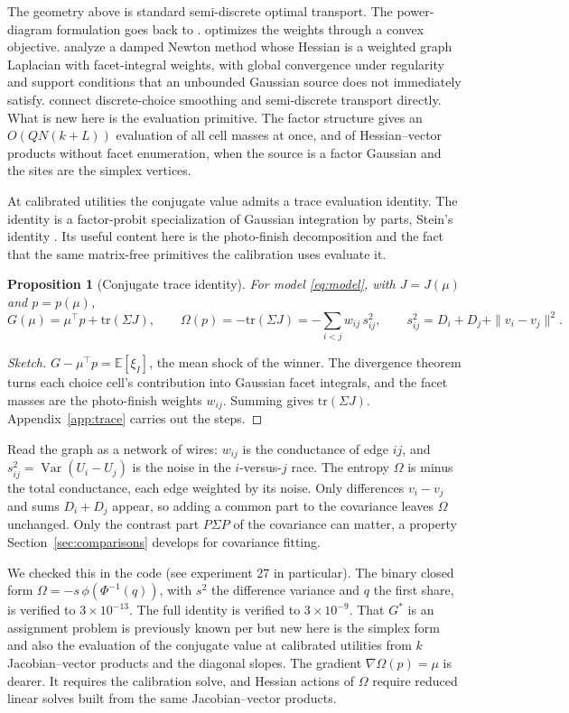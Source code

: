 \documentclass[12pt]{article}
\newtheorem{proposition}{Proposition}
\theoremstyle{remark}
\newcommand{\E}{\mathbb{E}}
\begin{document}
The geometry above is standard semi-discrete optimal transport. The
power-diagram formulation goes back to \citet{aurenhammer1998}.
\citet{levy2015} optimizes the weights through a convex objective.
\citet{kmt2019} analyze a damped Newton method whose Hessian is a
weighted graph Laplacian with facet-integral weights, with global
convergence under regularity and support conditions that an unbounded
Gaussian source does not immediately satisfy. \citet{taskesen2023}
connect discrete-choice smoothing and semi-discrete transport directly.
What is new here is the evaluation primitive. The factor structure gives an
$O(QN(k+L))$ evaluation of all cell masses at once, and of
Hessian--vector products without facet enumeration, when the source is
a factor Gaussian and the sites are the simplex vertices.

At calibrated utilities the conjugate value admits a trace evaluation
identity. The identity is a factor-probit specialization of Gaussian
integration by parts, Stein's identity \citep{stein1981}. Its useful
content here is the photo-finish decomposition and the fact that the
same matrix-free primitives the calibration uses evaluate it.

\begin{proposition}[Conjugate trace identity]\label{prop:trace}
For model \eqref{eq:model}, with $J = J(\mu)$ and $p = p(\mu)$,
\[
G(\mu) = \mu^\top p + \mathrm{tr}(\Sigma J),
\qquad
\Omega(p) = -\mathrm{tr}(\Sigma J)
= -\sum_{i<j} w_{ij}\, s_{ij}^2, \qquad
s_{ij}^2 = D_i + D_j + \|v_i - v_j\|^2 .
\]
\end{proposition}
\begin{proof}[Sketch]
$G - \mu^\top p = \E[\xi_I]$, the mean shock of the winner. The
divergence theorem turns each choice cell's contribution into Gaussian
facet integrals, and the facet masses are the photo-finish weights
$w_{ij}$. Summing gives $\mathrm{tr}(\Sigma J)$.
Appendix~\ref{app:trace} carries out the steps.
\end{proof}
Read the graph
as a network of wires: $w_{ij}$ is the conductance of
edge $ij$, and $s_{ij}^2 = \operatorname{Var}(U_i - U_j)$ is the noise in the
$i$-versus-$j$ race. The entropy $\Omega$ is minus the total
conductance, each edge weighted by its noise. Only differences $v_i -
v_j$ and sums $D_i + D_j$ appear, so adding a common part to the
covariance leaves $\Omega$ unchanged. Only the contrast part
$P\Sigma P$ of the covariance can matter, a property
Section~\ref{sec:comparisons} develops for covariance fitting.

We checked this in the code (see experiment 27 in particular). The
binary closed form $\Omega = -s\,\phi(\Phi^{-1}(q))$, with $s^2$ the
difference variance and $q$ the first share, is verified to
$3\times10^{-13}$. The full identity is verified to $3\times10^{-9}$. That $G^*$ is an assignment problem is previously known per
\citet{chiong2016} but new here is the simplex form and also the
evaluation of the conjugate value
at calibrated utilities from $k$ Jacobian--vector products and the
diagonal slopes. The gradient $\nabla\Omega(p) = \mu$ is dearer. It
requires the calibration solve, and Hessian actions of $\Omega$ require
reduced linear solves built from the same Jacobian--vector products.
\end{document}
